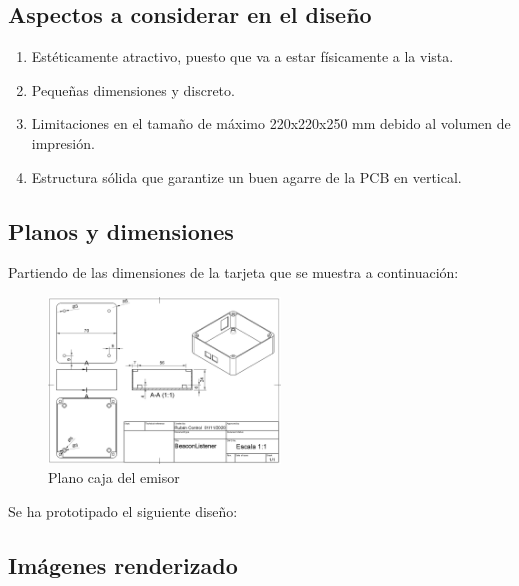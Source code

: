 \documentclass[a4paper ,12pt, onecolumn]{article}
\begin{document}
    \subsection{Aspectos a considerar en el diseño}
        \begin{enumerate}
            \item Estéticamente atractivo, puesto que va a estar físicamente a la vista.
            \item Pequeñas dimensiones y discreto.
            \item Limitaciones en el tamaño de máximo 220x220x250 mm debido al volumen de impresión.
            \item Estructura sólida que garantize un buen agarre de la PCB en vertical.
        \end{enumerate}
    \subsection{Planos y dimensiones}
        Partiendo de las dimensiones de la tarjeta que se muestra a continuación:
        \begin{center}
            \begin{figure}[h]
                \centering
                \includegraphics[width=0.55\textwidth]{../model_master.PNG}
                \caption{Plano caja del emisor}
                \label{fig:mesh1}
            \end{figure}
        \end{center}

        Se ha prototipado el siguiente diseño:
    \subsection{Imágenes renderizado}
\end{document}
